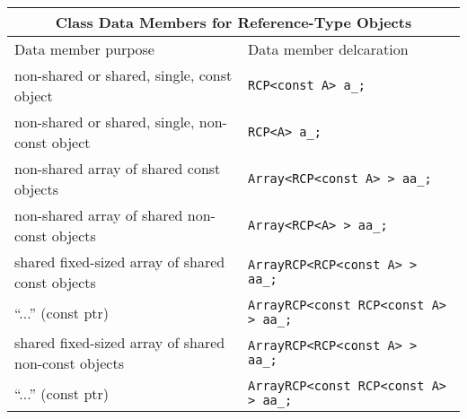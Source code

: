 \begin{tabular}{|l|l|}
%
\multicolumn{2}{c}{\textbf{Class Data Members for Reference-Type Objects}} \\
%
\hline
Data member purpose
& Data member delcaration \\
\hline
\hline
non-shared or shared, single, const object
& {}\texttt{RCP<const A> a\_;} \\
\hline
non-shared or shared, single, non-const object
& {}\texttt{RCP<A> a\_;} \\
\hline
non-shared array of shared const objects
& {}\texttt{Array<RCP<const A> > aa\_;} \\
\hline
non-shared array of shared non-const objects
& {}\texttt{Array<RCP<A> > aa\_;} \\
\hline
shared fixed-sized array of shared const objects
& {}\texttt{ArrayRCP<RCP<const A> > aa\_;} \\
\hline
``...'' (const ptr)
& {}\texttt{ArrayRCP<const RCP<const A> > aa\_;} \\
\hline
shared fixed-sized array of shared non-const objects
& {}\texttt{ArrayRCP<RCP<const A> > aa\_;} \\
\hline
``...'' (const ptr)
& {}\texttt{ArrayRCP<const RCP<const A> > aa\_;} \\
\hline
\end{tabular}
